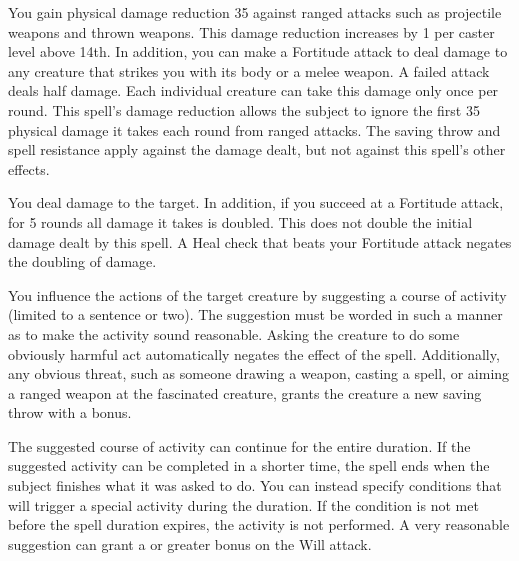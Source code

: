 \spelldur{\durshort \dismissable}
\spelleffect You gain physical damage reduction 35 against ranged attacks such as projectile weapons and thrown weapons. This damage reduction increases by 1 per caster level above 14th. In addition, you can make a Fortitude attack to deal damage to any creature that strikes you with its body or a melee weapon. A failed attack deals half damage. Each individual creature can take this damage only once per round.
\spellnotes This spell's damage reduction allows the subject to ignore the first 35 physical damage it takes each round from ranged attacks. The saving throw and spell resistance apply against the damage dealt, but not against this spell's other effects.

\spelleffect You deal damage to the target. In addition, if you succeed at a Fortitude attack, for 5 rounds all damage it takes is doubled. This does not double the initial damage dealt by this spell.
\spellnotes A Heal check that beats your Fortitude attack negates the doubling of damage. 

\spelleffect You influence the actions of the target creature by suggesting a course of activity (limited to a sentence or two). The suggestion must be worded in such a manner as to make the activity sound reasonable. Asking the creature to do some obviously harmful act automatically negates the effect of the spell. Additionally, any obvious threat, such as someone drawing a weapon, casting a spell, or aiming a ranged weapon at the fascinated creature, grants the creature a new saving throw with a  bonus.
\par The suggested course of activity can continue for the entire duration. If the suggested activity can be completed in a shorter time, the spell ends when the subject finishes what it was asked to do. You can instead specify conditions that will trigger a special activity during the duration. If the condition is not met before the spell duration expires, the activity is not performed.
\spellnotes A very reasonable suggestion can grant a  or greater bonus on the Will attack.

